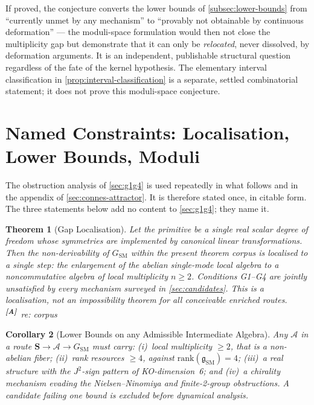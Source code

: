 \documentclass[12pt,a4paper,twoside]{article}
\theoremstyle{plain}
\newtheorem{theorem}{Theorem}[section]
\newtheorem{corollary}[theorem]{Corollary}
\theoremstyle{definition}
\theoremstyle{remark}
\newcommand{\catmark}[1]{\textsuperscript{\textsf{\textbf{[#1]}}}}
\begin{document}
If proved, the conjecture converts the lower bounds of
\cref{subsec:lower-bounds} from ``currently unmet by any mechanism'' to
``provably not obtainable by continuous deformation'' --- the moduli-space
formulation would then not close the multiplicity gap but demonstrate
that it can only be \emph{relocated}, never dissolved, by deformation
arguments. It is an independent, publishable structural question
regardless of the fate of the kernel hypothesis. The elementary interval
classification in \cref{prop:interval-classification} is a separate,
settled combinatorial statement; it does not prove this moduli-space conjecture.


\newpage
\section{Named Constraints: Localisation, Lower Bounds, Moduli}
\label{sec:named-constraints}

\noindent The obstruction analysis of \cref{sec:g1g4} is used repeatedly
in what follows and in the appendix of \cref{sec:connes-attractor}. It is
therefore stated once, in citable form. The three statements below add no
content to \cref{sec:g1g4}; they name it.

\begin{theorem}[Gap Localisation]
\label{thm:gap-localisation}
Let the primitive be a single real scalar degree of freedom whose
symmetries are implemented by canonical linear transformations. Then the
non-derivability of $G_{\mathrm{SM}}$ within the present theorem corpus
is localised to a single step: the enlargement of the abelian
single-mode local algebra to a noncommutative algebra of local
multiplicity $n \geq 2$. Conditions G1--G4 are jointly unsatisfied by
every mechanism surveyed in \cref{sec:candidates}. This is a
localisation, not an impossibility theorem for all conceivable enriched
routes.\catmark{A}\ \emph{re: corpus}
\end{theorem}

\begin{corollary}[Lower Bounds on any Admissible Intermediate Algebra]
\label{cor:algebra-lower-bounds}
Any $\mathcal A$ in a route $\mathbf S \to \mathcal A \to
G_{\mathrm{SM}}$ must carry: (i)~local multiplicity $\geq 2$, that is a
non-abelian fiber; (ii)~rank resources $\geq 4$, against
$\mathrm{rank}(\mathfrak g_{\mathrm{SM}}) = 4$; (iii)~a real structure
with the $J^2$-sign pattern of KO-dimension~6; and (iv)~a chirality
mechanism evading the Nielsen--Ninomiya and finite-2-group obstructions.
A candidate failing one bound is excluded before dynamical analysis.
\end{corollary}
\end{document}
